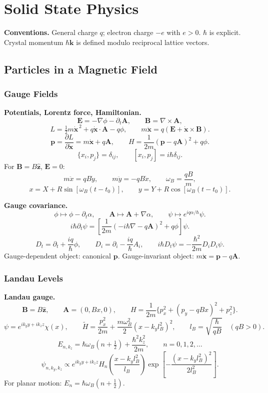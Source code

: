 \section{Solid State Physics}
\label{sec:solid-state-physics}

\noindent\textbf{Conventions.}\quad
General charge $q$; electron charge $-e$ with $e>0$. $\hbar$ is explicit.
Crystal momentum $\hbar\mathbf k$ is defined modulo reciprocal lattice vectors.

\subsection{Particles in a Magnetic Field}

\subsubsection*{Gauge Fields}

\noindent\textbf{Potentials, Lorentz force, Hamiltonian.}
\[
\mathbf E=-\nabla\phi-\partial_t\mathbf A,\qquad
\mathbf B=\nabla\times\mathbf A,
\]
\[
L=\tfrac12m\dot{\mathbf x}^{\,2}+q\dot{\mathbf x}\cdot\mathbf A-q\phi,
\qquad
\boxed{m\ddot{\mathbf x}=q(\mathbf E+\dot{\mathbf x}\times\mathbf B)}.
\]
\[
\mathbf p=\frac{\partial L}{\partial\dot{\mathbf x}}=m\dot{\mathbf x}+q\mathbf A,
\qquad
\boxed{H=\frac{1}{2m}(\mathbf p-q\mathbf A)^2+q\phi}.
\]
\[
\{x_i,p_j\}=\delta_{ij},\qquad [x_i,p_j]=i\hbar\delta_{ij}.
\]
For $\mathbf B=B\hat{\mathbf z}$, $\mathbf E=0$:
\[
m\ddot x=qB\dot y,\qquad m\ddot y=-qB\dot x,\qquad
\omega_B=\frac{qB}{m},
\]
\[
x=X+R\sin[\omega_B(t-t_0)],\qquad
y=Y+R\cos[\omega_B(t-t_0)].
\]

\noindent\textbf{Gauge covariance.}
\[
\phi\mapsto\phi-\partial_t\alpha,\qquad
\mathbf A\mapsto\mathbf A+\nabla\alpha,\qquad
\psi\mapsto e^{iq\alpha/\hbar}\psi.
\]
\[
i\hbar\partial_t\psi
=\left[\frac{1}{2m}(-i\hbar\nabla-q\mathbf A)^2+q\phi\right]\psi.
\]
\[
D_t=\partial_t+\frac{iq}{\hbar}\phi,\qquad
D_i=\partial_i-\frac{iq}{\hbar}A_i,\qquad
\boxed{i\hbar D_t\psi=-\frac{\hbar^2}{2m}D_iD_i\psi}.
\]
Gauge-dependent object: canonical $\mathbf p$. Gauge-invariant object:
$m\dot{\mathbf x}=\mathbf p-q\mathbf A$. 

\subsubsection*{Landau Levels}

\noindent\textbf{Landau gauge.}
\[
\mathbf B=B\hat{\mathbf z},\qquad \mathbf A=(0,Bx,0),\qquad
H=\frac{1}{2m}\{p_x^2+(p_y-qBx)^2+p_z^2\}.
\]
\[
\psi=e^{ik_yy+ik_zz}\chi(x),\qquad
\widetilde H=\frac{p_x^2}{2m}+
\frac{m\omega_B^2}{2}(x-k_yl_B^2)^2,\qquad
l_B=\sqrt{\frac{\hbar}{qB}}\quad(qB>0).
\]
\[
\boxed{E_{n,k_z}=\hbar\omega_B\left(n+\tfrac12\right)
+\frac{\hbar^2k_z^2}{2m}},\qquad n=0,1,2,\ldots
\]
\[
\psi_{n,k_y,k_z}\propto e^{ik_yy+ik_zz}
H_n\!\left(\frac{x-k_yl_B^2}{l_B}\right)
\exp\!\left[-\frac{(x-k_yl_B^2)^2}{2l_B^2}\right].
\]
For planar motion: $E_n=\hbar\omega_B(n+\tfrac12)$.

